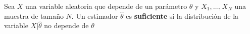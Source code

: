 %
%

\begin{definicion}
Sea $X$ una variable aleatoria que depende de un parámetro $\theta$ y $X_1, \dots, X_N$ una muestra de tamaño $N$. Un estimador $\widehat{\theta}$ es \textbf{suficiente} si
la distribución de la variable $X \lvert \widehat{\theta}$ no depende de $\theta$
\end{definicion}

